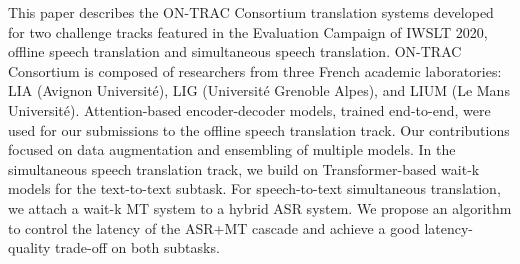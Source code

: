 This paper describes the ON-TRAC Consortium translation systems developed for two challenge tracks featured in the Evaluation Campaign of IWSLT 2020, offline speech translation and simultaneous speech translation. ON-TRAC Consortium is composed of researchers from three French academic laboratories: LIA (Avignon Université), LIG (Université Grenoble Alpes), and LIUM (Le Mans Université). Attention-based encoder-decoder models, trained end-to-end, were used for our submissions to the offline speech translation track. Our contributions focused on data augmentation and ensembling of multiple models. In the simultaneous speech translation track, we build on Transformer-based wait-k models for the text-to-text subtask. For speech-to-text simultaneous translation, we attach a wait-k MT system to a hybrid ASR system. We propose an algorithm to control the latency of the ASR+MT cascade and achieve a good latency-quality trade-off on both subtasks.
